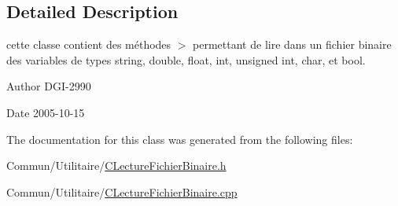 \subsection{Detailed Description}
cette classe contient des méthodes $>$ permettant de lire dans un fichier binaire des variables de types string, double, float, int, unsigned int, char, et bool. 

\begin{DoxyAuthor}{Author}
D\+G\+I-\/2990 
\end{DoxyAuthor}
\begin{DoxyDate}{Date}
2005-\/10-\/15 
\end{DoxyDate}


The documentation for this class was generated from the following files\+:\begin{DoxyCompactItemize}
\item 
Commun/\+Utilitaire/\hyperlink{_c_lecture_fichier_binaire_8h}{C\+Lecture\+Fichier\+Binaire.\+h}\item 
Commun/\+Utilitaire/\hyperlink{_c_lecture_fichier_binaire_8cpp}{C\+Lecture\+Fichier\+Binaire.\+cpp}\end{DoxyCompactItemize}
